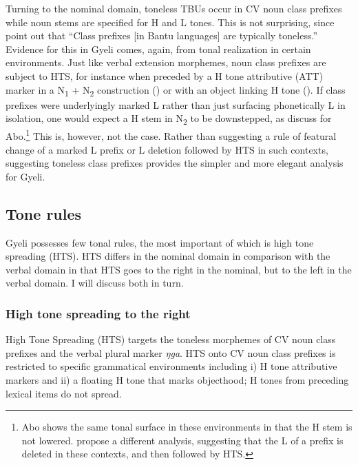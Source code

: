 Turning to the nominal domain, toneless TBUs occur in CV noun class prefixes while noun stems are specified for H and L tones. This is not surprising, since \citet[60]{kisseberth2003} point out that ``Class prefixes [in Bantu languages] are typically toneless.'' Evidence for this in Gyeli comes, again, from tonal realization in certain environments. Just like verbal extension morphemes, noun class prefixes are subject to HTS, for instance when preceded by a H tone attributive (ATT) marker in a N\textsubscript{1} + N\textsubscript{2} construction () or with an object linking H tone (). If class prefixes were underlyingly marked L rather than just surfacing phonetically L in isolation, one would expect a H stem in N\textsubscript{2} to be downstepped, as \citet[175]{hyman2011} discuss for Abo.\footnote{Abo shows the same tonal surface in these environments in that the H stem is not lowered. \citet[175]{hyman2011} propose a different analysis, suggesting that the L of a prefix is deleted in these contexts, and then followed by HTS.} This is, however, not the case. Rather than suggesting a rule of featural change of a marked L prefix or L deletion followed by HTS in such contexts, suggesting toneless class prefixes provides the simpler and more elegant analysis for Gyeli.






\subsection{Tone rules}
\label{sec:Trules}

Gyeli possesses few tonal rules, the most important of which is high tone spreading (HTS). HTS differs in the nominal domain in comparison with the verbal domain in that HTS goes to the right in the nominal, but to the left in the verbal domain. I will discuss both in turn.



 \subsubsection{High tone spreading to the right}
\label{sec:HTSr}

High Tone Spreading (HTS) targets the toneless morphemes of CV noun class prefixes and the verbal plural marker {\itshape ŋga}.  HTS onto CV noun class prefixes is restricted to specific grammatical environments including i) H tone attributive markers and ii) a floating H tone that marks objecthood; H tones from preceding lexical items do not spread.


